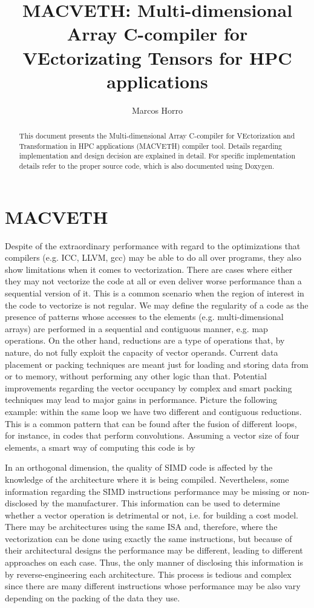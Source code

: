 \documentclass[a4paper,12pt]{memoir}
\title{\textbf{MACVETH}: \textbf{M}ulti-dimensional \textbf{A}rray
    \textbf{C}-compiler for \textbf{VE}ctorizating
    \textbf{T}ensors for \textbf{H}PC applications}
\author{Marcos Horro}
\date{}
\begin{document}
\maketitle

\begin{abstract}
	This document presents the Multi-dimensional Array C-compiler for VEctorization
	and Transformation in HPC applications (MACVETH) compiler tool. Details
	regarding implementation and design decision are explained in detail. For
	specific implementation details refer to the proper source code, which is also
	documented using Doxygen.
\end{abstract}

\chapter{MACVETH}

Despite of the extraordinary performance with regard to the optimizations that
compilers (e.g. ICC, LLVM, gcc) may be able to do all over programs, they also
show limitations when it comes to vectorization. There are cases where either
they may not vectorize the code at all or even deliver worse performance than a
sequential version of it. This is a common scenario when the region of interest
in the code to vectorize is not regular. We may define the regularity of a code
as the presence of patterns whose accesses to the elements (e.g.
multi-dimensional arrays) are performed in a sequential and contiguous manner,
e.g. map operations. On the other hand, reductions are a type of operations
that, by nature,
do not fully exploit the capacity of vector operands. Current data placement or
packing techniques are meant just for loading and storing data from or to
memory, without performing any other logic than that. Potential improvements
regarding the vector occupancy by complex and smart packing techniques may lead
to major gains in performance. Picture the following example: within the same
loop we have two different and contiguous reductions. This is a common pattern
that can be found after the fusion of different loops, for instance, in codes
that perform convolutions. Assuming a vector size of four elements, a smart way
of computing this code is by

In an orthogonal dimension, the quality of SIMD code is affected by the knowledge of the architecture where it is being compiled. Nevertheless, some information regarding the SIMD instructions performance may be missing or non-disclosed by the manufacturer. This information can be used to determine whether a vector operation is detrimental or not, i.e. for building a cost model. There may be architectures using the same ISA and, therefore, where the vectorization can be done using exactly the same instructions, but because of their architectural designs the performance may be different, leading to different approaches on each case. Thus, the only manner of disclosing this information is by reverse-engineering each architecture. This process is tedious and complex since there are many different instructions whose performance may be also vary depending on the packing of the data they use.
\end{document}
